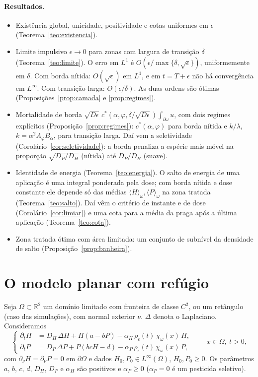 \documentclass[11pt,a4paper]{article}
\numberwithin{equation}{section}
\theoremstyle{definition}
\theoremstyle{remark}
\newcommand{\R}{\mathbb{R}}
\newcommand{\med}[1]{\langle #1\rangle_\omega}
\begin{document}
\paragraph{Resultados.}
\begin{itemize}
\item Existência global, unicidade, positividade e cotas uniformes em $\epsilon$
(Teorema~\ref{teo:existencia}).
\item Limite impulsivo $\epsilon\to0$ para zonas com largura de transição $\delta$
(Teorema~\ref{teo:limite}). O erro em $L^1$ é $O(\epsilon/\max\{\delta,\sqrt\epsilon\})$,
uniformemente em $\delta$. Com borda nítida: $O(\sqrt\epsilon)$ em $L^1$, e em $t=T+\epsilon$ não há
convergência em $L^\infty$. Com transição larga: $O(\epsilon/\delta)$. As duas ordens são ótimas
(Proposições~\ref{prop:camada} e \ref{prop:regimes}).
\item Mortalidade de borda $\sqrt{D\epsilon}\,c^*(\alpha,\varphi,\delta/\sqrt{D\epsilon})\int_{\partial\omega}u$,
com dois regimes explícitos (Proposição~\ref{prop:regimes}): $c^*(\alpha,\varphi)$ para borda nítida e
$k/\lambda$, $k=\alpha^2A_\varphi B_\alpha$, para transição larga. Daí vem a seletividade
(Corolário~\ref{cor:seletividade}): a borda penaliza a espécie mais móvel na proporção $\sqrt{D_P/D_H}$
(nítida) até $D_P/D_H$ (suave).
\item Identidade de energia (Teorema~\ref{teo:energia}). O salto de energia de uma aplicação é uma
integral ponderada pela dose; com borda nítida e dose constante ele depende só das médias
$\med H,\med P$ na zona tratada (Teorema~\ref{teo:salto}). Daí vêm o
critério de instante e de dose (Corolário~\ref{cor:limiar}) e uma cota para a média da praga
após a última aplicação (Teorema~\ref{teo:cota}).
\item Zona tratada ótima com área limitada: um conjunto de subnível da densidade de salto
(Proposição~\ref{prop:banheira}).
\end{itemize}

\section{O modelo planar com refúgio}

Seja $\Omega\subset\R^2$ um domínio limitado com fronteira de classe $C^2$, ou um retângulo (caso das
simulações), com normal exterior $\nu$. $\Delta$ denota o Laplaciano. Consideramos
\begin{equation}\label{eq:modelo}
\left\{
\begin{aligned}
\partial_t H &= D_H\,\Delta H + H(a-bP) - \alpha_H\,\rho_\epsilon(t)\,\chi_\omega(x)\,H,\\
\partial_t P &= D_P\,\Delta P + P(bcH-d) - \alpha_P\,\rho_\epsilon(t)\,\chi_\omega(x)\,P,
\end{aligned}\right.
\qquad x\in\Omega,\ t>0,
\end{equation}
com $\partial_\nu H=\partial_\nu P=0$ em $\partial\Omega$ e dados $H_0,P_0\in L^\infty(\Omega)$,
$H_0,P_0\ge0$. Os parâmetros $a$, $b$, $c$, $d$, $D_H$, $D_P$ e $\alpha_H$ são positivos e $\alpha_P\ge0$
($\alpha_P=0$ é um pesticida seletivo).
\end{document}
